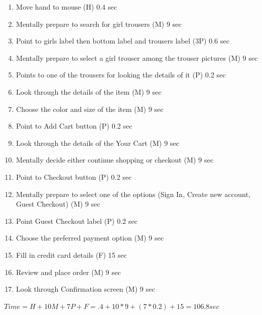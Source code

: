 \begin{enumerate}
  \item Move hand to mouse (H) 0.4 sec
  \item Mentally prepare to search for girl trousers (M) 9 sec
  \item Point to girls label then bottom label and trousers label (3P) 0.6 sec
  \item Mentally prepare to select a girl trouser among the trouser pictures (M) 9 sec
  \item Points to one of the trousers  for looking the details of it (P) 0.2 sec
  \item Look through the details of the item (M) 9 sec
  \item Choose the color and size of the item (M) 9 sec
  \item Point to Add Cart button (P) 0.2 sec
  \item Look through the details of the Your Cart (M) 9 sec
  \item Mentally decide either continue shopping or checkout (M) 9 sec
  \item Point to Checkout button (P) 0.2 sec
  \item Mentally prepare to select one of the options (Sign In, Create new account, Guest Checkout) (M) 9 sec
  \item Point Guest Checkout label (P) 0.2 sec
  \item Choose the preferred payment option (M) 9 sec
  \item Fill in credit card details (F) 15 sec
  \item Review and place order (M) 9 sec
  \item Look through Confirmation screen (M) 9 sec
\end{enumerate}


$Time=H+10M+7P+F=.4+10*9+(7*0.2)+15 = 106.8 sec$


%
%
%